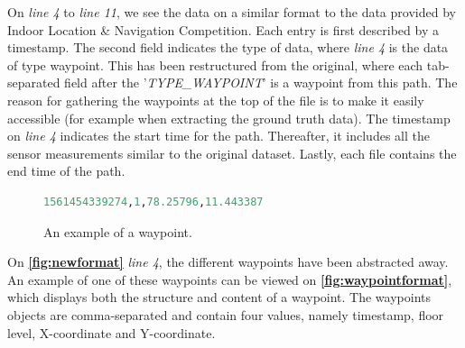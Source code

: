 
On \textit{line 4} to \textit{line 11}, we see the data on a similar format to the data provided by Indoor Location \& Navigation Competition. Each entry is first described by a timestamp. The second field indicates the type of data, where \textit{line 4} is the data of type waypoint. This has been restructured from the original, where each tab-separated field after the '\textit{TYPE\_WAYPOINT}' is a waypoint from this path. The reason for gathering the waypoints at the top of the file is to make it easily accessible (for example when extracting the ground truth data). The timestamp on \textit{line 4} indicates the start time for the path. Thereafter, it includes all the sensor measurements similar to the original dataset. Lastly, each file contains the end time of the path.

\begin{figure}[H]
\lstset{numbers=left}
\begin{lstlisting}[language=Python]
1561454339274,1,78.25796,11.443387
\end{lstlisting}
\caption{An example of a waypoint.}
\label{fig:waypointformat}
\end{figure}

On \textbf{\autoref{fig:newformat}} \textit{line 4}, the different waypoints have been abstracted away. An example of one of these waypoints can be viewed on \textbf{\autoref{fig:waypointformat}}, which displays both the structure and content of a waypoint. The waypoints objects are comma-separated and contain four values, namely timestamp, floor level, X-coordinate and Y-coordinate.

